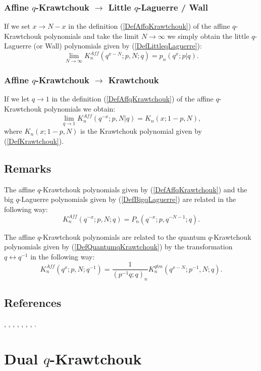 \documentclass[envcountchap,graybox]{svmono}
\begin{document}
\subsubsection*{Affine $q$-Krawtchouk $\rightarrow$ Little $q$-Laguerre / Wall}
If we set $x\rightarrow N-x$ in the definition (\ref{DefAffqKrawtchouk})
of the affine $q$-Krawtchouk polynomials and take the limit
$N\rightarrow\infty$ we simply obtain the little $q$-Laguerre (or Wall)
polynomials given by (\ref{DefLittleqLaguerre}):
\begin{equation}
\lim_{N\rightarrow\infty}K_n^{Aff}(q^{x-N};p,N;q)=p_n(q^x;p|q).
\end{equation}

\subsubsection*{Affine $q$-Krawtchouk $\rightarrow$ Krawtchouk}
If we let $q\rightarrow 1$ in the definition (\ref{DefAffqKrawtchouk}) of the affine
$q$-Krawtchouk polynomials we obtain:
\begin{equation}
\lim_{q\rightarrow 1}K_n^{Aff}(q^{-x};p,N|q)=K_n(x;1-p,N),
\end{equation}
where $K_n(x;1-p,N)$ is the Krawtchouk polynomial given by (\ref{DefKrawtchouk}).

\subsection*{Remarks}
The affine $q$-Krawtchouk polynomials given by (\ref{DefAffqKrawtchouk})
and the big $q$-Laguerre polynomials given by (\ref{DefBigqLaguerre}) are
related in the following way:
$$K_n^{Aff}(q^{-x};p,N;q)=P_n(q^{-x};p,q^{-N-1};q).$$

\noindent
The affine $q$-Krawtchouk polynomials are related to the quantum
$q$-Krawtchouk polynomials given by (\ref{DefQuantumqKrawtchouk})
by the transformation $q\leftrightarrow q^{-1}$ in the following way:
$$K_n^{Aff}(q^x;p,N;q^{-1})=\frac{1}{(p^{-1}q;q)_n}
K_n^{qtm}(q^{x-N};p^{-1},N;q).$$

\subsection*{References}
\cite{AtakRahmanSuslov}, \cite{LChiharaStanton}, \cite{Delsarte},
\cite{DelsarteGoethals}, \cite{Dunkl78II}, \cite{FlorisKoelink},
\cite{GasperRahman90}, \cite{Stanton84}.


\section{Dual $q$-Krawtchouk}
\par\setcounter{equation}{0}
\end{document}
